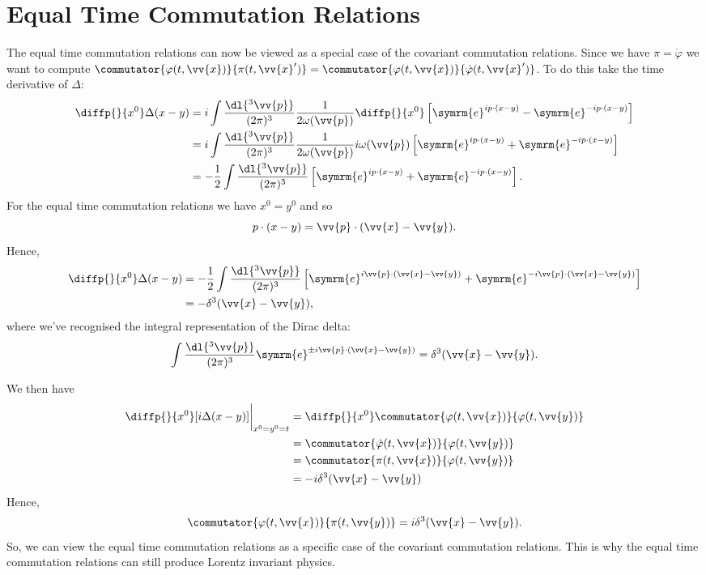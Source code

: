 \documentclass[fleqn]{NotesClass}
\newcommand{\e}{\symrm{e}}
\begin{document}
    \section{Equal Time Commutation Relations}
    The equal time commutation relations can now be viewed as a special case of the covariant commutation relations.
    Since we have \(\pi = \dot{\varphi}\) we want to compute \(\commutator{\varphi(t, \vv{x})}{\pi(t, \vv{x}')} = \commutator{\varphi(t, \vv{x})}{\dot{\varphi}(t, \vv{x}')}\).
    To do this take the time derivative of \(\Delta\):
    \begin{align}
        \diffp{}{x^0} \Delta(x - y) &= i \int \frac{\dl{^3\vv{p}}}{(2\pi)^3} \frac{1}{2\omega(\vv{p})} \diffp{}{x^0} \left[ \e^{ip\cdot(x - y)} - \e^{-ip\cdot(x - y)} \right]\\
        &=i \int \frac{\dl{^3\vv{p}}}{(2\pi)^3} \frac{1}{2\omega(\vv{p})} i\omega(\vv{p}) \left[ \e^{ip\cdot(x - y)} + \e^{-ip\cdot(x - y)} \right]\\
        &= -\frac{1}{2} \int \frac{\dl{^3\vv{p}}}{(2\pi)^3} \left[ \e^{ip\cdot(x - y)} + \e^{-ip\cdot(x - y)} \right].
    \end{align}
    For the equal time commutation relations we have \(x^0 = y^0\) and so
    \begin{equation}
        p \cdot (x - y) = \vv{p} \cdot (\vv{x} - \vv{y}).
    \end{equation}
    Hence,
    \begin{align}
        \diffp{}{x^0} \Delta(x - y) &= -\frac{1}{2} \int \frac{\dl{^3\vv{p}}}{(2\pi)^3} \left[ \e^{i\vv{p}\cdot(\vv{x} - \vv{y})} + \e^{-i\vv{p}\cdot(\vv{x} - \vv{y})} \right]\\
        &= -\delta^3(\vv{x} - \vv{y}),
    \end{align}
    where we've recognised the integral representation of the Dirac delta:
    \begin{equation}
        \int \frac{\dl{^3\vv{p}}}{(2\pi)^3} \e^{\pm i\vv{p} \cdot (\vv{x} - \vv{y})} = \delta^3(\vv{x} - \vv{y}).
    \end{equation}
    
    We then have
    \begin{align}
        \diffp{}{x^0} [i\Delta(x - y)] \bigg|_{x^0 = y^0 = t} &= \diffp{}{x^0} \commutator{\varphi(t, \vv{x})}{\varphi(t, \vv{y})}\\
        &= \commutator{\dot{\varphi}(t, \vv{x})}{\varphi(t, \vv{y})}\\
        &= \commutator{\pi(t, \vv{x})}{\varphi(t, \vv{y})}\\
        &= -i\delta^3(\vv{x} - \vv{y})
    \end{align}
    Hence,
    \begin{equation}
        \commutator{\varphi(t, \vv{x})}{\pi(t, \vv{y})} = i\delta^3(\vv{x} - \vv{y}).
    \end{equation}
    So, we can view the equal time commutation relations as a specific case of the covariant commutation relations.
    This is why the equal time commutation relations can still produce Lorentz invariant physics.
    
\end{document}
